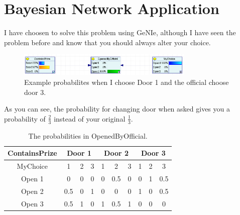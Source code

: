 \documentclass[a4paper]{article}
\begin{document}
    \section{Bayesian Network Application}
        I have choosen to solve this problem using GeNIe, although I have seen the problem before and know that you should always alter your choice.
        \begin{figure}[h!]
            \centering
            \includegraphics[width=0.75\textwidth]{genie.png}
            \caption{Example probabilites when I choose Door 1 and the official choose door 3.}
        \end{figure}
        \par
        As you can see, the probability for changing door when asked gives you a probability of $\frac{2}{3}$ instead of your original $\frac{1}{3}$.
        \begin{table}[h]
            \centering
            \begin{tabular}{ |c|c|c|c|c|c|c|c|c|c|}
                \hline
                ContainsPrize & \multicolumn{3}{|c|}{Door 1} & \multicolumn{3}{|c|}{Door 2} & \multicolumn{3}{|c|}{Door 3}\\\hline
                MyChoice & 1 & 2 & 3 & 1 & 2 & 3 & 1 & 2 & 3\\\hline
                Open 1 & 0   & 0 & 0 & 0 & 0.5 & 0 & 0 & 1 & 0.5\\
                Open 2 & 0.5 & 0 & 1 & 0 & 0   & 0 & 1 & 0 & 0.5\\
                Open 3 & 0.5 & 1 & 0 & 1 & 0.5 & 1 & 0 & 0 & 0\\\hline
            \end{tabular}
            \caption{The probabilities in OpenedByOfficial.}
        \end{table}
\end{document}

